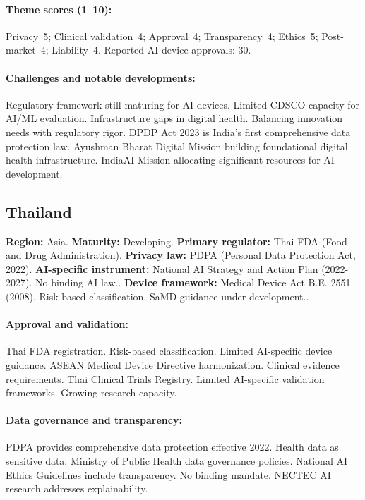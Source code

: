 {\paragraph{Theme scores (1--10):}
Privacy~5;
Clinical validation~4;
Approval~4;
Transparency~4;
Ethics~5;
Post-market~4;
Liability~4.
Reported AI device approvals: 30.

\paragraph{Challenges and notable developments:}
Regulatory framework still maturing for AI devices. Limited CDSCO capacity for AI/ML evaluation. Infrastructure gaps in digital health. Balancing innovation needs with regulatory rigor.
DPDP Act 2023 is India's first comprehensive data protection law. Ayushman Bharat Digital Mission building foundational digital health infrastructure. IndiaAI Mission allocating significant resources for AI development.


\subsection{Thailand}
\textbf{Region:} Asia.
\textbf{Maturity:} Developing.
\textbf{Primary regulator:} Thai FDA (Food and Drug Administration).
\textbf{Privacy law:} PDPA (Personal Data Protection Act, 2022).
\textbf{AI-specific instrument:} National AI Strategy and Action Plan (2022-2027). No binding AI law..
\textbf{Device framework:} Medical Device Act B.E. 2551 (2008). Risk-based classification. SaMD guidance under development..

\paragraph{Approval and validation:}
Thai FDA registration. Risk-based classification. Limited AI-specific device guidance. ASEAN Medical Device Directive harmonization.
Clinical evidence requirements. Thai Clinical Trials Registry. Limited AI-specific validation frameworks. Growing research capacity.

\paragraph{Data governance and transparency:}
PDPA provides comprehensive data protection effective 2022. Health data as sensitive data. Ministry of Public Health data governance policies.
National AI Ethics Guidelines include transparency. No binding mandate. NECTEC AI research addresses explainability.

}
